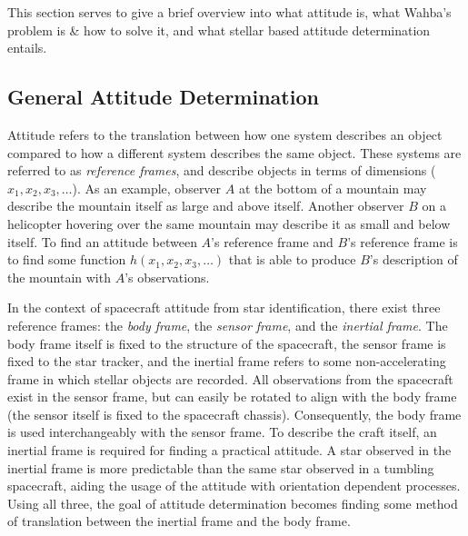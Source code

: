 \documentclass[conference]{IEEEtran}
\begin{document}
    This section serves to give a brief overview into what attitude is, what Wahba's problem is \& how to solve it, and what
    stellar based attitude determination entails.

    \subsection{General Attitude Determination}\label{subsec:generalAttitudeDetermination}
    Attitude refers to the translation between how one system describes an object compared to how a different system
    describes the same object.
    These systems are referred to as \textit{reference frames}, and describe objects in terms of dimensions ($x_1, x_2, x_3,
    \ldots$).
    As an example, observer $A$ at the bottom of a mountain may describe the mountain itself as large and above itself.
    Another observer $B$ on a helicopter hovering over the same mountain may describe it as small and below itself.
    To find an attitude between $A$'s reference frame and $B$'s reference frame is to find some function $h(x_1, x_2, x_3,
    \ldots)$ that is able to produce $B$'s description of the mountain with $A$'s observations.

    In the context of spacecraft attitude from star identification, there exist three reference frames: the
    \textit{body frame}, the \textit{sensor frame}, and the \textit{inertial frame}.
    The body frame itself is fixed to the structure of the spacecraft, the sensor frame is fixed to the star tracker,
    and the inertial frame refers to some non-accelerating frame in which stellar objects are recorded.
    All observations from the spacecraft exist in the sensor frame, but can easily be rotated to align with the body frame
    (the sensor itself is fixed to the spacecraft chassis).
    Consequently, the body frame is used interchangeably with the sensor frame.
    To describe the craft itself, an inertial frame is required for finding a practical attitude.
    A star observed in the inertial frame is more predictable than the same star observed in a tumbling spacecraft, aiding
    the usage of the attitude with orientation dependent processes.
    Using all three, the goal of attitude determination becomes finding some method of translation between the inertial
    frame and the body frame.
\end{document}
